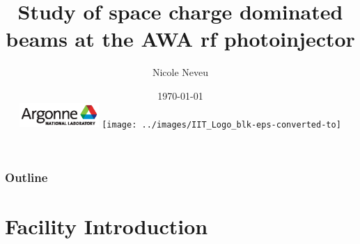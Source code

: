 \documentclass[professionalfonts,t]{beamer}
\title[Space Charge 2017]{Study of space charge dominated beams at the AWA rf photoinjector}
\author[N.Neveu]{{\Large Nicole Neveu}}
\institute[ANL, IIT] %
{   Illinois Institute of Technology \\
	Argonne National Laboratory \\
    \url{nneveu@anl.gov} 
}
\date{ \today \\
\includegraphics[width=3cm,keepaspectratio]{../images/Argonne_cmyk_black}%
\hfill \hfill \hfill%
\texttt{[image: ../images/IIT\_Logo\_blk-eps-converted-to]}%
}
\begin{document}
\begin{frame}
  \titlepage
\end{frame}
\begin{frame}
	\frametitle{Outline}
	\tableofcontents
\end{frame}






\section{Facility Introduction}
\end{document}
